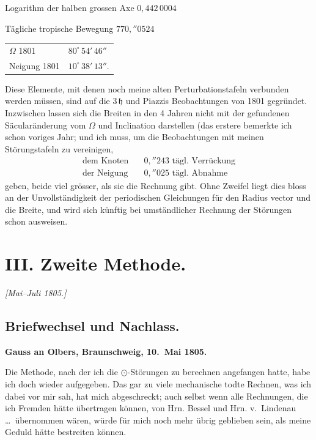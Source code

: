 \documentclass[12pt,a4paper]{article}
\newcommand{\Ceres}{\odot}
\newcommand{\Jupiter}{\mathfrak{h}}
\begin{document}
Logarithm der halben grossen Axe $0{,}442\,0004$

Tägliche tropische Bewegung $770{,}''0524$

\begin{center}
\begin{tabular}{l@{\quad}l}
$\Omega$ 1801 & $80^\circ\,54'\,46''$\\
Neigung 1801 & $10^\circ\,38'\,13''$.\\
\end{tabular}
\end{center}

Diese Elemente, mit denen noch meine alten Perturbationstafeln verbunden werden müssen, sind auf die $3\,\Jupiter$ und Piazzis Beobachtungen von 1801 gegründet. Inzwischen lassen sich die Breiten in den 4 Jahren nicht mit der gefundenen Säcularänderung vom $\Omega$ und Inclination darstellen (das erstere bemerkte ich schon voriges Jahr; und ich muss, um die Beobachtungen mit meinen Störungstafeln zu vereinigen,
\begin{align*}
\text{dem Knoten} &\quad 0{,}''243 \text{ tägl. Verrückung}\\
\text{der Neigung} &\quad 0{,}''025 \text{ tägl. Abnahme}
\end{align*}
geben, beide viel grösser, als sie die Rechnung gibt. Ohne Zweifel liegt dies bloss an der Unvollständigkeit der periodischen Gleichungen für den Radius vector und die Breite, und wird sich künftig bei umständlicher Rechnung der Störungen schon ausweisen.

\newpage
\setcounter{page}{411}
%
\section*{III. Zweite Methode.}
\noindent\textit{[Mai--Juli 1805.]}

\subsection*{Briefwechsel und Nachlass.}

\medskip\noindent
\textbf{Gauss an Olbers, Braunschweig, 10.~Mai 1805.}

Die Methode, nach der ich die $\Ceres$-Störungen zu berechnen angefangen hatte, habe ich doch wieder aufgegeben. Das gar zu viele mechanische todte Rechnen, was ich dabei vor mir sah, hat mich abgeschreckt; auch selbst wenn alle Rechnungen, die ich Fremden hätte übertragen können, von Hrn. Bessel und Hrn. v.~Lindenau \ldots\ übernommen wären, würde für mich noch mehr übrig geblieben sein, als meine Geduld hätte bestreiten können.
\end{document}
